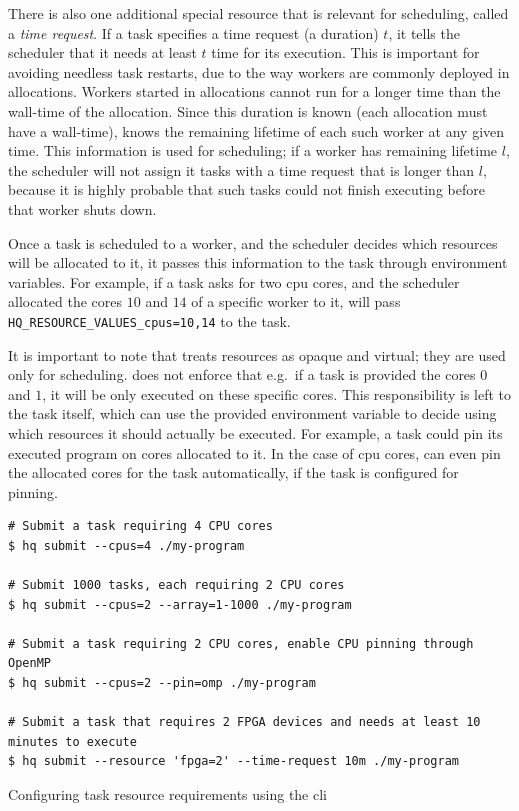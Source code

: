There is also one additional special resource that is relevant for scheduling, called a
\emph{time request}. If a task specifies a time request (a duration) $t$, it
tells the scheduler that it needs at least $t$ time for its execution. This is
important for avoiding needless task restarts, due to the way \hq{} workers are
commonly deployed in allocations. Workers started in allocations cannot run for a longer time than
the wall-time of the allocation. Since this duration is known (each allocation must have a
wall-time), \hq{} knows the remaining lifetime of each such worker at any given
time. This information is used for scheduling; if a worker has remaining lifetime
$l$, the scheduler will not assign it tasks with a time request that is longer
than $l$, because it is highly probable that such tasks could not finish
executing before that worker shuts down.

Once a task is scheduled to a worker, and the scheduler decides which resources will be allocated
to it, it passes this information to the task through environment variables. For example, if a task
asks for two \gls{cpu} cores, and the scheduler allocated the cores
$10$ and $14$ of a specific worker to it,
\hq{} will pass \texttt{HQ\_RESOURCE\_VALUES\_cpus=10,14} to the task.

It is important to note that \hyperqueue{} treats resources as opaque and virtual; they
are used only for scheduling. \hq{} does not enforce that e.g.\ if a task is
provided the cores $0$ and $1$, it will be only executed on
these specific cores. This responsibility is left to the task itself, which can use the provided
environment variable to decide using which resources it should actually be executed. For example, a
task could pin its executed program on cores allocated to it. In the case of
\gls{cpu} cores, \hq{} can even pin the allocated cores for the
task automatically, if the task is configured for pinning.

\begin{listing}[h]
	\begin{verbatim}
# Submit a task requiring 4 CPU cores
$ hq submit --cpus=4 ./my-program

# Submit 1000 tasks, each requiring 2 CPU cores
$ hq submit --cpus=2 --array=1-1000 ./my-program

# Submit a task requiring 2 CPU cores, enable CPU pinning through OpenMP
$ hq submit --cpus=2 --pin=omp ./my-program

# Submit a task that requires 2 FPGA devices and needs at least 10 minutes to execute
$ hq submit --resource 'fpga=2' --time-request 10m ./my-program
	\end{verbatim}
	\caption{Configuring task resource requirements using the \hyperqueue{} \acrshort{cli}}
	\label{lst:hq-cli-task-resources}
\end{listing}

